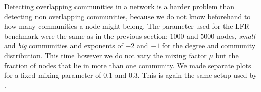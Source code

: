 Detecting overlapping communities in a network is a harder problem than detecting non overlapping communities, because we do not know beforehand to how many communities a node might belong. The parameter used for the LFR benchmark were the same as in the previous section: $1000$ and $5000$ nodes, \textit{small} and \textit{big} communities and exponents of $-2$ and $-1$ for the degree and community distribution. This time however we do not vary the mixing factor $\mu$ but the fraction of nodes that lie in more than one community. We made separate plots for a fixed mixing parameter of $0.1$ and $0.3$. This is again the same setup used by \cite{LF09}.